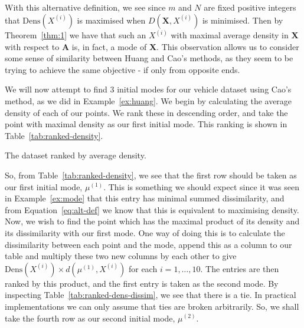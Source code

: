 

\begin{remark}
    With this alternative definition, we see \- since \(m\) and \(N\) are fixed
    positive integers \- that \(\text{Dens}(X^{(i)})\) is maximised when
    \(D(\textbf{X}, X^{(i)})\) is minimised. Then by Theorem~\ref{thm:1} we have
    that such an \(X^{(i)}\) with maximal average density in \textbf{X} with
    respect to \textbf{A} is, in fact, a mode of \textbf{X}. This observation
    allows us to consider some sense of similarity between Huang and Cao's
    methods, as they seem to be trying to achieve the same objective - if only
    from opposite ends.\\
\end{remark}

\begin{example}\label{ex:cao}
    We will now attempt to find \(3\) initial modes for our vehicle dataset 
    using Cao's method, as we did in Example~\ref{ex:huang}. We begin by 
    calculating the average density of each of our points. We rank these in 
    descending order, and take the point with maximal density as our first 
    initial mode. This ranking is shown in Table~\ref{tab:ranked-density}.

    \begin{table}[H]
    \centering
    \resizebox{.8\textwidth}{!}{%
        
    }
    \caption{The dataset ranked by average density.}\label{%
    tab:ranked-density}
    \end{table}

    So, from Table~\ref{tab:ranked-density}, we see that the first row should be
    taken as our first initial mode, \(\mu^{(1)}\). This is something we should
    expect since it was seen in Example~\ref{ex:mode} that this entry has
    minimal summed dissimilarity, and from Equation~\ref{eq:alt-def} we know
    that this is equivalent to maximising density.\\
    
    Now, we wish to find the point which has the maximal product of its density
    and its dissimilarity with our first mode. One way of doing this is to 
    calculate the dissimilarity between each point and the mode, append this
    as a column to our table and multiply these two new columns by each other
    to give \(\text{Dens}(X^{(i)}) \times d(\mu^{(1)}, X^{(i)})\) for each \(i =
    1, \ldots, 10\). The entries are then ranked by this product, and the first
    entry is taken as the second mode. By inspecting 
    Table~\ref{tab:ranked-dens-dissim}, we see that there is a tie. In practical
    implementations we can only assume that ties are broken arbitrarily. So, we
    shall take the fourth row as our second initial mode, \(\mu^{(2)}\).\\


\end{example}
